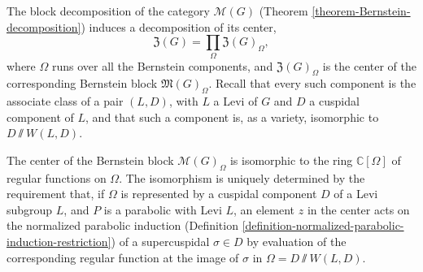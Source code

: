 The block decomposition of the category $\mathcal M(G)$ (Theorem \ref{theorem-Bernstein-decomposition}) induces a decomposition of its center,
\begin{equation}
	\label{equation-decomposition-Bernstein-center}
	\mathfrak Z(G) = \prod_\Omega \mathfrak Z(G)_\Omega,
\end{equation}
where $\Omega$ runs over all the Bernstein components, and $\mathfrak Z(G)_\Omega$ is the center of the corresponding Bernstein block $\mathfrak M(G)_\Omega$. Recall that every such component is the associate class of a pair $(L,D)$, with $L$ a Levi of $G$ and $D$ a cuspidal component of $L$, and that such a component is, as a variety, isomorphic to $D\sslash W(L,D)$.

\begin{theorem}
   \label{theorem-Bernstein-center}	
The center of the Bernstein block $\mathcal M(G)_\Omega$ is isomorphic to the ring $\mathbb C[\Omega]$ of regular functions on $\Omega$. The isomorphism is uniquely determined by the requirement that, if $\Omega$ is represented by a cuspidal component $D$ of a Levi subgroup $L$, and $P$ is a parabolic with Levi $L$, an element $z$ in the center acts on the normalized parabolic induction (Definition \ref{definition-normalized-parabolic-induction-restriction}) of a supercuspidal $\sigma\in D$ by evaluation of the corresponding regular function at the image of $\sigma$ in $\Omega = D\sslash W(L,D)$.
\end{theorem}

